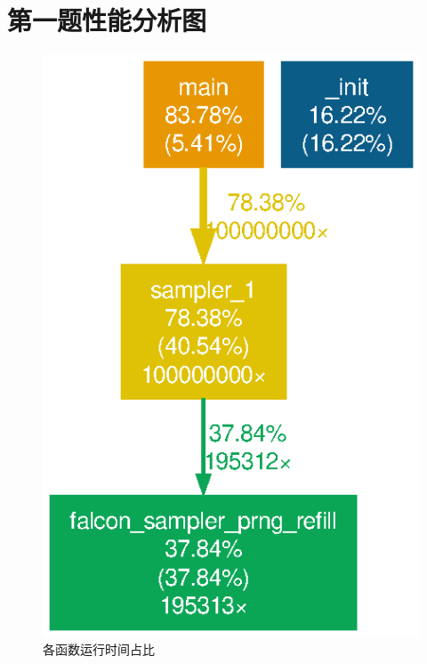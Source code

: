 \documentclass{article}
\begin{document}
	
	\appendix
	\newpage
	\section{第一题性能分析图}
	\begin{figure}[htb]
		\centering
		\includegraphics[width=.6\textwidth]{../gprof_figs/sampler_1.eps}
		\caption{各函数运行时间占比}
	\end{figure}
\end{document}
